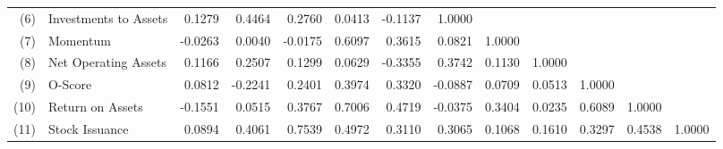 \begin{table}[hbt]
{\begin{tabular}{@{}rlrrrrrrrrrrr@{}}
    (6) & Investments to Assets & 0.1279 & 0.4464 & 0.2760 & 0.0413 & -0.1137 & 1.0000 &  &  &  &  &  \\
    (7) & Momentum & -0.0263 & 0.0040 & -0.0175 & 0.6097 & 0.3615 & 0.0821 & 1.0000 &  &  &  &  \\
    (8) & Net Operating Assets & 0.1166 & 0.2507 & 0.1299 & 0.0629 & -0.3355 & 0.3742 & 0.1130 & 1.0000 &  &  &  \\
    (9) & O-Score & 0.0812 & -0.2241 & 0.2401 & 0.3974 & 0.3320 & -0.0887 & 0.0709 & 0.0513 & 1.0000 &  &  \\
    (10) & Return on Assets & -0.1551 & 0.0515 & 0.3767 & 0.7006 & 0.4719 & -0.0375 & 0.3404 & 0.0235 & 0.6089 & 1.0000 &  \\
    (11) & Stock Issuance & 0.0894 & 0.4061 & 0.7539 & 0.4972 & 0.3110 & 0.3065 & 0.1068 & 0.1610 & 0.3297 & 0.4538 & 1.0000 \\ \bottomrule
    \end{tabular}%
    }
    \end{table}